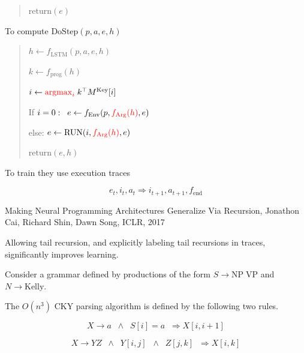 {\begin{quotation}
\vfill
$\mathrm{return}(e)$
\end{quotation}


To compute $\mathrm{DoStep}(p,a,e,h)$

\vfill
\begin{quotation}
$h \leftarrow f_{\mathrm{LSTM}}(p,a,e,h)$

\vfill
$k \leftarrow f_{\mathrm{prog}}(h)$

\vfill
$i \leftarrow {\color{red} \operatorname*{argmax}_i}\; k^\top M^{\mathrm{Key}}[i]$

\vfill
If $i = 0:\;\;e \leftarrow f_{\mathrm{Env}}(p,{\color{red} f_\mathrm{Arg}(h)},e)$

\vfill
else: $e \leftarrow \mathrm{RUN}(i,{\color{red} f_\mathrm{Arg}(h)},e)$

\vfill
$\mathrm{return}(e,h)$
\end{quotation}


To train they use execution traces

\vfill
$$e_t, i_t, a_t \Rightarrow  i_{t+1},a_{t+1},f_{\mathrm{end}}$$


\vfill
Making Neural Programming Architectures
Generalize Via Recursion, Jonathon Cai, Richard Shin, Dawn Song, ICLR, 2017

\vfill
Allowing tail recursion, and explicitly labeling tail recursions in traces, significantly improves learning.

}



Consider a grammar defined by productions of the form $S \rightarrow \mathrm{NP}\;\mathrm{VP}$ and $N \rightarrow \mathrm{Kelly}$.

\vfill
The $O(n^3)$ CKY parsing algorithm is defined by the following two rules.

$$X \rightarrow a \;\;\wedge \;\; S[i] = a \;\; \Rightarrow X[i,i+1]$$

\vfill
$$X \rightarrow YZ \;\;\wedge \;\; Y[i,j]\;\; \wedge \;\; Z[j,k] \;\;\Rightarrow X[i,k]$$
